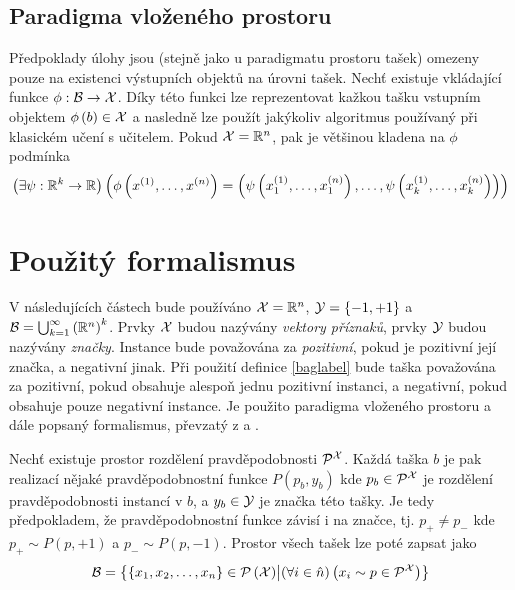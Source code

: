 \subsection{Paradigma vloženého prostoru}
Předpoklady úlohy jsou (stejně jako u paradigmatu prostoru tašek) omezeny pouze na existenci výstupních objektů na úrovni tašek. Nechť existuje vkládající funkce \( \phi : \mathcal B \to \mathcal X \). Díky této funkci lze reprezentovat kažkou tašku vstupním objektem \( \phi \left( b \right) \in \mathcal X \) a nasledně lze použít jakýkoliv algoritmus používaný při klasickém učení s učitelem. Pokud \( \mathcal X = \mathbb R^n \), pak je většinou kladena na \( \phi \) podmínka
\begin{equation}
	\left( \exists \psi : \mathbb R^k \to \mathbb R \right) \left( \phi \left( x^{(1)}, \dots, x^{(n)} \right) = \left( \psi \left( x_1^{(1)}, \dots, x_1^{(n)} \right), \dots, \psi \left( x_k^{(1)}, \dots, x_k^{(n)} \right) \right) \right)
\end{equation}

\section{Použitý formalismus}\label{used_formalism}
V následujících částech bude používáno \( \mathcal X = \mathbb R^n \), \( \mathcal Y = \left\{ -1, +1 \right\} \) a \( \mathcal B = \bigcup_{k = 1}^{\infty} \left( \mathbb R^n \right) ^k \). Prvky \( \mathcal X \) budou nazývány \textit{vektory příznaků}, prvky \( \mathcal Y \) budou nazývány \textit{značky}. Instance bude považována za \textit{pozitivní}, pokud je pozitivní její značka, a negativní jinak. Při použití definice \eqref{baglabel} bude taška považována za pozitivní, pokud obsahuje alespoň jednu pozitivní instanci, a negativní, pokud obsahuje pouze negativní instance. Je použito paradigma vloženého prostoru a dále popsaný formalismus, převzatý z \cite{pevny_using_2016} a \cite{pevny_discriminative_2016}.

Nechť existuje prostor rozdělení pravděpodobnosti \( \mathcal P^{\mathcal X} \). Každá taška \( b \) je pak realizací nějaké pravděpodobnostní funkce \( P \left( p_b, y_b \right) \) kde \( p_b \in \mathcal P^{\mathcal X} \) je rozdělení pravděpodobnosti instancí v \( b \), a \( y_b \in \mathcal Y \) je značka této tašky. Je tedy předpokladem, že pravděpodobnostní funkce závisí i na značce, tj. \( p_+ \neq p_- \) kde \( p_+ \sim P(p, +1) \) a \( p_- \sim P(p, -1) \). Prostor všech tašek lze poté zapsat jako
\begin{equation}
	\mathcal B = \left\{ \left\{ x_1, x_2, \dots, x_n \right\} \in \mathcal P \left( \mathcal X \right) \middle| \left( \forall i \in \hat n \right) \left( x_i \sim p \in \mathcal P^{\mathcal X} \right) \right\}
\end{equation}

